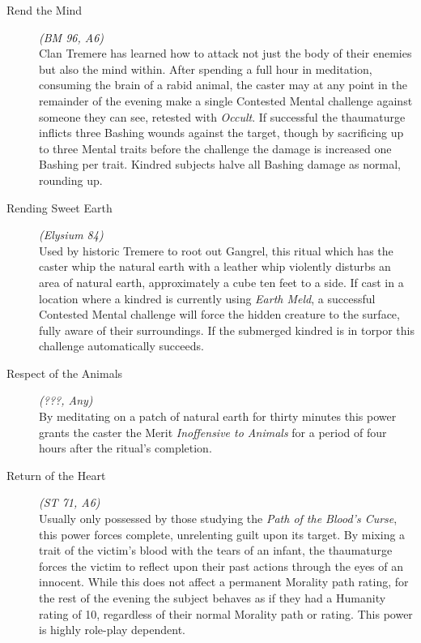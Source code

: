 \begin{description}
	\item[Rend the Mind] \emph{(BM 96, A6)} \hfill \\
	Clan Tremere has learned how to attack not just the body of their enemies but also the mind within.  After spending a full hour 
	in meditation, consuming the brain of a rabid animal, the caster may at any point in the remainder of the evening make a 
	single Contested Mental challenge against someone they can see, retested with \emph{Occult}.  If successful the thaumaturge 
	inflicts three Bashing wounds against the target, though by sacrificing up to three Mental traits before the challenge the 
	damage is increased one Bashing per trait.  Kindred subjects halve all Bashing damage as normal, rounding up. \\

	\item[Rending Sweet Earth] \emph{(Elysium 84)} \hfill \\
	Used by historic Tremere to root out Gangrel, this ritual which has the caster whip the natural earth with a leather whip violently 
	disturbs an area of natural earth, approximately a cube ten feet to a side.  If cast in a location where a kindred is currently 
	using \emph{Earth Meld}, a successful Contested Mental challenge will force the hidden creature to the surface, fully aware of 
	their surroundings.  If the submerged kindred is in torpor this challenge automatically succeeds. \\

	\item[Respect of the Animals] \emph{(???, Any)} \hfill \\
	By meditating on a patch of natural earth for thirty minutes this power grants the caster the Merit \emph{Inoffensive to Animals} 
	for a period of four hours after the ritual's completion. \\

	\item[Return of the Heart] \emph{(ST 71, A6)} \hfill \\
	Usually only possessed by those studying the \emph{Path of the Blood's Curse}, this power forces complete, unrelenting guilt 
	upon its target.  By mixing a trait of the victim's blood with the tears of an infant, the thaumaturge forces the victim to 
	reflect upon their past actions through the eyes of an innocent.  While this does not affect a permanent Morality path rating, 
	for the rest of the evening the subject behaves as if they had a Humanity rating of 10, regardless of their normal Morality path 
	or rating.  This power is highly role-play dependent. \\


\end{description}
